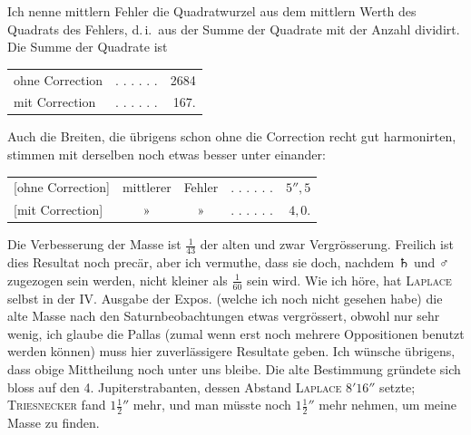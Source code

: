 \par Ich nenne mittlern Fehler die Quadratwurzel aus dem mittlern Werth des Quadrats des Fehlers, d.\,i.\ aus der Summe der Quadrate mit der Anzahl dividirt. Die Summe der Quadrate ist
\begin{center}
\begin{tabular}{@{}lcr@{}}
ohne Correction&. . . . . .&2684\\
mit Correction&. . . . . .&167.
\end{tabular}
\end{center}
\par Auch die Breiten, die übrigens schon ohne die Correction recht gut harmonirten, stimmen mit derselben noch etwas besser unter einander:
\begin{center}
\begin{tabular}{@{}lcccr@{}}
[ohne Correction]&mittlerer&Fehler&. . . . . .&\(5''{,}5\)\\
{}[mit Correction]&»&»&. . . . . .&\(4{,}0\).
\end{tabular}
\end{center}
\par Die Verbesserung der Masse ist \(\frac{1}{43}\) der alten und zwar Vergrösserung. Freilich ist dies Resultat noch precär, aber ich vermuthe, dass sie doch, nachdem {\AstroSymbols ♄} und {\AstroSymbols ♂} zugezogen sein werden, nicht kleiner als \(\frac{1}{60}\) sein wird. Wie ich höre, hat \textsc{Laplace} selbst in der IV. Ausgabe der Expos. (welche ich noch nicht gesehen habe) die alte Masse nach den Saturnbeobachtungen etwas vergrössert, obwohl nur sehr wenig, ich glaube die Pallas (zumal wenn erst noch mehrere Oppositionen benutzt werden können) muss hier zuverlässigere Resultate geben. Ich wünsche übrigens, dass obige Mittheilung noch unter uns bleibe. Die alte Bestimmung gründete sich bloss auf den 4. Jupiterstrabanten, dessen Abstand \textsc{Laplace} \(8'16''\) setzte; \textsc{Triesnecker} fand \(1\frac{1}{2}''\) mehr, und man müsste noch \(1\frac{1}{2}''\) mehr nehmen, um meine Masse zu finden.
\par
